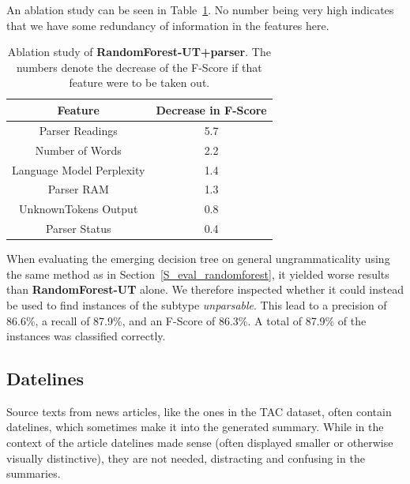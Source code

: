 \documentclass[a4paper,10pt]{scrartcl}
\theoremstyle{style}
\begin{document}
An ablation study can be seen in Table~\ref{ablation_study_randomforest}. No number being very high indicates that we have some redundancy of information in the features here.
\begin{table}
\begin{center}
\begin{tabular}{c|c}
  \hline\hline
  Feature & Decrease in F-Score\\%
  \hline
  Parser Readings & 5.7\\%
  Number of Words & 2.2\\%
  Language Model Perplexity & 1.4\\%
  Parser RAM & 1.3\\%
  UnknownTokens Output & 0.8\\%
  Parser Status & 0.4\\%
  \hline\hline
  \end{tabular}
  \end{center}

  \caption{Ablation study of \textbf{RandomForest-UT+parser}. The numbers denote the decrease of the F-Score if that feature were to be taken out.}
  \label{ablation_study_randomforest}
 \end{table}

When evaluating the emerging decision tree on general ungrammaticality using the same method as in Section~\ref{S_eval_randomforest}, it yielded worse results than \textbf{RandomForest-UT} alone. We therefore inspected whether it could instead be used to find instances of the subtype \textit{unparsable}. This lead to a precision of 86.6\%, a recall of 87.9\%, and an F-Score of 86.3\%. A total of 87.9\% of the instances was classified correctly.

\subsection{Datelines}
\label{s_datelines}
Source texts from news articles, like the ones in the TAC dataset, often contain datelines, which sometimes make it into the generated summary. While in the context of the article datelines made sense (often displayed smaller or otherwise visually distinctive), they are not needed, distracting and confusing in the summaries.
\end{document}
